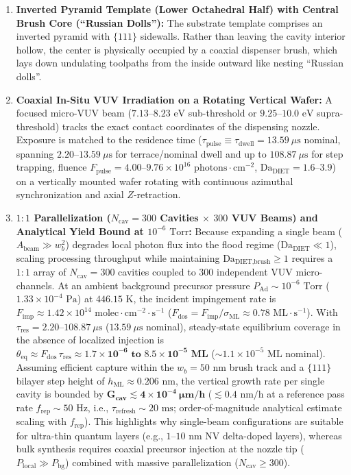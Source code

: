\documentclass[10pt,twocolumn,a4paper]{article}
\begin{document}
\begin{enumerate}
    \item \textbf{Inverted Pyramid Template (Lower Octahedral Half) with Central Brush Core (``Russian Dolls''):} The substrate template comprises an inverted pyramid with $\{111\}$ sidewalls. Rather than leaving the cavity interior hollow, the center is physically occupied by a coaxial dispenser brush, which lays down undulating toolpaths from the inside outward like nesting ``Russian dolls''.
    \item \textbf{Coaxial In-Situ VUV Irradiation on a Rotating Vertical Wafer:} A focused micro-VUV beam ($7.13\text{--}8.23\text{ eV}$ sub-threshold or $9.25\text{--}10.0\text{ eV}$ supra-threshold) tracks the exact contact coordinates of the dispensing nozzle. Exposure is matched to the residence time ($\tau_{\text{pulse}} \equiv \tau_{\text{dwell}} = 13.59\ \mu\text{s}$ nominal, spanning $2.20\text{--}13.59\ \mu\text{s}$ for terrace/nominal dwell and up to $108.87\ \mu\text{s}$ for step trapping, fluence $F_{\text{pulse}} = 4.00\text{--}9.76 \times 10^{16}\text{ photons}\cdot\text{cm}^{-2}$, $\text{Da}_{\text{DIET}} = 1.6\text{--}3.9$) on a vertically mounted wafer rotating with continuous azimuthal synchronization and axial $Z$-retraction.
    \item \textbf{$1:1$ Parallelization ($N_{\text{cav}} = 300$ Cavities $\times$ $300$ VUV Beams) and Analytical Yield Bound at $10^{-6}\text{ Torr}$:} Because expanding a single beam ($A_{\text{beam}} \gg w_b^2$) degrades local photon flux into the flood regime ($\text{Da}_{\text{DIET}} \ll 1$), scaling processing throughput while maintaining $\text{Da}_{\text{DIET,brush}} \ge 1$ requires a $1:1$ array of $N_{\text{cav}} = 300$ cavities coupled to $300$ independent VUV micro-channels. At an ambient background precursor pressure $P_{\text{Ad}} \sim 10^{-6}\text{ Torr}$ ($1.33 \times 10^{-4}\text{ Pa}$) at $446.15\text{ K}$, the incident impingement rate is $F_{\text{imp}} \approx 1.42 \times 10^{14}\text{ molec}\cdot\text{cm}^{-2}\cdot\text{s}^{-1}$ ($F_{\text{dos}} = F_{\text{imp}}/\sigma_{\text{ML}} \approx 0.78\text{ ML}\cdot\text{s}^{-1}$). With $\tau_{\text{res}} = 2.20\text{--}108.87\ \mu\text{s}$ ($13.59\ \mu\text{s}$ nominal), steady-state equilibrium coverage in the absence of localized injection is $\theta_{\text{eq}} \approx F_{\text{dos}}\,\tau_{\text{res}} \approx \mathbf{1.7 \times 10^{-6}\text{ to }8.5 \times 10^{-5}\text{ ML}}$ ($\sim 1.1 \times 10^{-5}\text{ ML}$ nominal). Assuming efficient capture within the $w_b = 50\text{ nm}$ brush track and a $\{111\}$ bilayer step height of $h_{\text{ML}} \approx 0.206\text{ nm}$, the vertical growth rate per single cavity is bounded by $\mathbf{G_{\text{cav}} \lesssim 4 \times 10^{-4}\ \mu\text{m/h}}$ ($\lesssim 0.4\text{ nm/h}$ at a reference pass rate $f_{\text{rep}} \sim 50\text{ Hz}$, i.e., $\tau_{\text{refresh}} \sim 20\text{ ms}$; order-of-magnitude analytical estimate scaling with $f_{\text{rep}}$). This highlights why single-beam configurations are suitable for ultra-thin quantum layers (e.g., $1\text{--}10\text{ nm}$ NV delta-doped layers), whereas bulk synthesis requires coaxial precursor injection at the nozzle tip ($P_{\text{local}} \gg P_{\text{bg}}$) combined with massive parallelization ($N_{\text{cav}} \ge 300$).

\end{enumerate}
\end{document}
